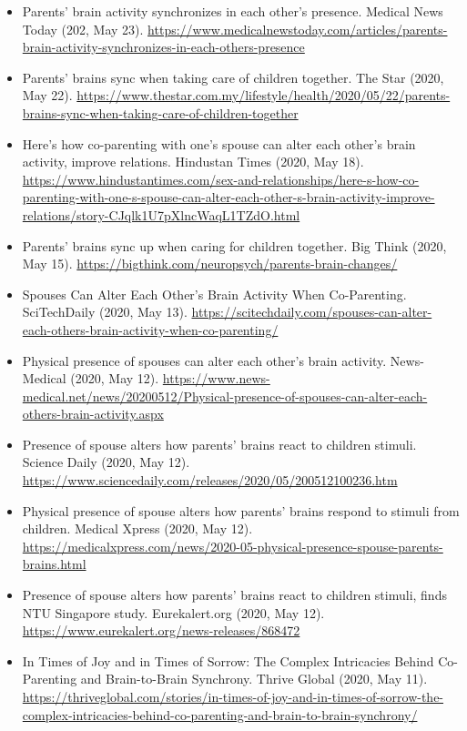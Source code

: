 \documentclass[10pt,a4paper]{altacv}
\begin{document}
\begin{fullwidth}
\begin{itemize}
			\item Parents’ brain activity synchronizes in each other’s presence. Medical News Today (202, May 23). \url{https://www.medicalnewstoday.com/articles/parents-brain-activity-synchronizes-in-each-others-presence}
			\item Parents’ brains sync when taking care of children together. The Star (2020, May 22). \url{https://www.thestar.com.my/lifestyle/health/2020/05/22/parents-brains-sync-when-taking-care-of-children-together}
			\item Here’s how co-parenting with one’s spouse can alter each other’s brain activity, improve relations. Hindustan Times (2020, May 18). \url{https://www.hindustantimes.com/sex-and-relationships/here-s-how-co-parenting-with-one-s-spouse-can-alter-each-other-s-brain-activity-improve-relations/story-CJqlk1U7pXlncWaqL1TZdO.html}
			\item Parents’ brains sync up when caring for children together. Big Think (2020, May 15). \url{https://bigthink.com/neuropsych/parents-brain-changes/}
			\item Spouses Can Alter Each Other’s Brain Activity When Co-Parenting. SciTechDaily (2020, May 13). \url{https://scitechdaily.com/spouses-can-alter-each-others-brain-activity-when-co-parenting/}
			\item Physical presence of spouses can alter each other's brain activity. News-Medical (2020, May 12). \url{https://www.news-medical.net/news/20200512/Physical-presence-of-spouses-can-alter-each-others-brain-activity.aspx}
			\item Presence of spouse alters how parents' brains react to children stimuli. Science Daily (2020, May 12). \url{https://www.sciencedaily.com/releases/2020/05/200512100236.htm}
			\item Physical presence of spouse alters how parents' brains respond to stimuli from children. Medical Xpress (2020, May 12). \url{https://medicalxpress.com/news/2020-05-physical-presence-spouse-parents-brains.html}
			\item Presence of spouse alters how parents' brains react to children stimuli, finds NTU Singapore study. Eurekalert.org (2020, May 12). \url{https://www.eurekalert.org/news-releases/868472}
			\item In Times of Joy and in Times of Sorrow: The Complex Intricacies Behind Co-Parenting and Brain-to-Brain Synchrony. Thrive Global (2020, May 11). \url{https://thriveglobal.com/stories/in-times-of-joy-and-in-times-of-sorrow-the-complex-intricacies-behind-co-parenting-and-brain-to-brain-synchrony/}

\end{itemize}
\end{fullwidth}
\end{document}
